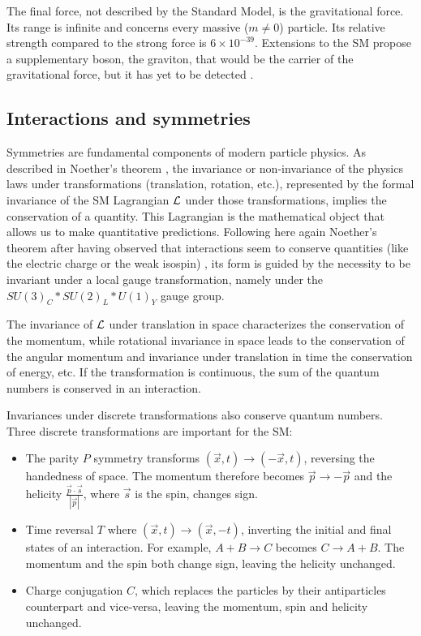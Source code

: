 The final force, not described by the Standard Model, is the gravitational force. Its range is infinite and concerns every massive ($m \neq 0$) particle. Its relative strength compared to the strong force is $6\times 10^{-39}$. Extensions to the SM propose a supplementary boson, the graviton, that would be the carrier of the gravitational force, but it has yet to be detected \cite{ParticleDataGroup:2024cfk, carney_graviton_2024}.

\subsection{Interactions and symmetries}

Symmetries are fundamental components of modern particle physics. As described in Noether's theorem \cite{noether_invariant_1971}, the invariance or non-invariance of the physics laws under transformations (translation, rotation, etc.), represented by the formal invariance of the SM Lagrangian ${\cal L}$ under those transformations, implies the conservation of a quantity.
This Lagrangian is the mathematical object that allows us to make quantitative predictions. Following here again Noether's theorem after having observed that interactions seem to conserve quantities (like the electric charge or the weak isospin) , its form is guided by the necessity to be invariant under a local gauge transformation, namely under the $SU(3)_C*SU(2)_L*U(1)_Y$ gauge group.

The invariance of ${\cal L}$ under translation in space characterizes the conservation of the momentum, while rotational invariance in space leads to the conservation of the angular momentum and invariance under translation in time the conservation of energy, etc. If the transformation is continuous, the sum of the quantum numbers is conserved in an interaction.

Invariances under discrete transformations also conserve quantum numbers. Three discrete transformations are important for the SM:
\begin{itemize}
  \item The parity $P$ symmetry transforms $(\vec{x}, t) \rightarrow (-\vec{x}, t)$, reversing the handedness of space. The momentum therefore becomes $\vec{p} \rightarrow -\vec{p}$ and the helicity $\frac{\vec{p} \cdot \vec{s}}{|\vec{p}|}$, where $\vec{s}$ is the spin, changes sign.

  \item Time reversal $T$ where $(\vec{x}, t) \rightarrow (\vec{x}, -t)$, inverting the initial and final states of an interaction. For example, $A + B \rightarrow C$ becomes $C \rightarrow A + B$. The momentum and the spin both change sign, leaving the helicity unchanged.

  \item Charge conjugation $C$, which replaces the particles by their antiparticles counterpart and vice-versa, leaving the momentum, spin and helicity unchanged.
\end{itemize}

